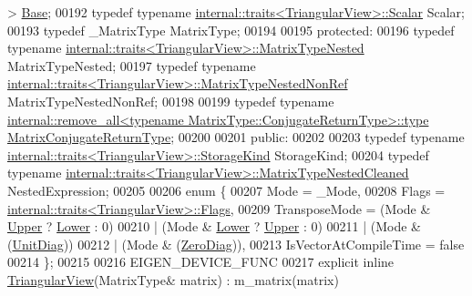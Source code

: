 \begin{DoxyCode}
       > \hyperlink{class_eigen_1_1_triangular_view_impl}{Base};
00192     \textcolor{keyword}{typedef} \textcolor{keyword}{typename} \hyperlink{struct_eigen_1_1internal_1_1traits}{internal::traits<TriangularView>::Scalar} 
      Scalar;
00193     \textcolor{keyword}{typedef} \_MatrixType MatrixType;
00194 
00195   \textcolor{keyword}{protected}:
00196     \textcolor{keyword}{typedef} \textcolor{keyword}{typename} \hyperlink{struct_eigen_1_1internal_1_1traits}{internal::traits<TriangularView>::MatrixTypeNested}
       MatrixTypeNested;
00197     \textcolor{keyword}{typedef} \textcolor{keyword}{typename} \hyperlink{struct_eigen_1_1internal_1_1traits}{internal::traits<TriangularView>::MatrixTypeNestedNonRef}
       MatrixTypeNestedNonRef;
00198 
00199     \textcolor{keyword}{typedef} \textcolor{keyword}{typename} 
      \hyperlink{group___sparse_core___module}{internal::remove\_all<typename MatrixType::ConjugateReturnType>::type}
       \hyperlink{group___sparse_core___module}{MatrixConjugateReturnType};
00200     
00201   \textcolor{keyword}{public}:
00202 
00203     \textcolor{keyword}{typedef} \textcolor{keyword}{typename} \hyperlink{struct_eigen_1_1internal_1_1traits}{internal::traits<TriangularView>::StorageKind}
       StorageKind;
00204     \textcolor{keyword}{typedef} \textcolor{keyword}{typename} \hyperlink{struct_eigen_1_1internal_1_1traits}{internal::traits<TriangularView>::MatrixTypeNestedCleaned}
       NestedExpression;
00205 
00206     \textcolor{keyword}{enum} \{
00207       Mode = \_Mode,
00208       Flags = \hyperlink{struct_eigen_1_1internal_1_1traits}{internal::traits<TriangularView>::Flags},
00209       TransposeMode = (Mode & \hyperlink{group__enums_gga39e3366ff5554d731e7dc8bb642f83cda6bcb58be3b8b8ec84859ce0c5ac0aaec}{Upper} ? \hyperlink{group__enums_gga39e3366ff5554d731e7dc8bb642f83cda891792b8ed394f7607ab16dd716f60e6}{Lower} : 0)
00210                     | (Mode & \hyperlink{group__enums_gga39e3366ff5554d731e7dc8bb642f83cda891792b8ed394f7607ab16dd716f60e6}{Lower} ? \hyperlink{group__enums_gga39e3366ff5554d731e7dc8bb642f83cda6bcb58be3b8b8ec84859ce0c5ac0aaec}{Upper} : 0)
00211                     | (Mode & (\hyperlink{group__enums_gga39e3366ff5554d731e7dc8bb642f83cdaddb72f888ac85d5a1c52333e54f9374b}{UnitDiag}))
00212                     | (Mode & (\hyperlink{group__enums_gga39e3366ff5554d731e7dc8bb642f83cda884ff7240392e85aa6e4b3c957e36483}{ZeroDiag})),
00213       IsVectorAtCompileTime = \textcolor{keyword}{false}
00214     \};
00215 
00216     EIGEN\_DEVICE\_FUNC
00217     \textcolor{keyword}{explicit} \textcolor{keyword}{inline} \hyperlink{group___core___module_class_eigen_1_1_triangular_view}{TriangularView}(MatrixType& matrix) : m\_matrix(matrix)

\end{DoxyCode}
